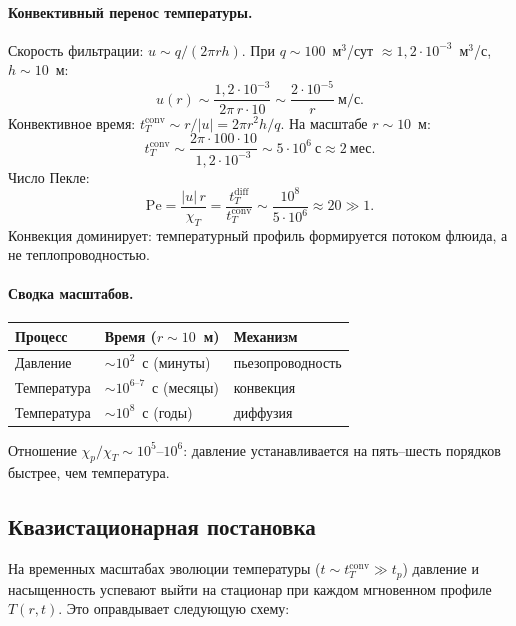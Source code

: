﻿\documentclass[12pt,a4paper]{article}
\begin{document}
\paragraph{Конвективный перенос температуры.}
Скорость фильтрации: $u \sim q/(2\pi r h)$.
При $q \sim 100$~м$^3$/сут $\approx 1{,}2\cdot 10^{-3}$~м$^3$/с,
$h \sim 10$~м:
\[
  u(r) \sim \frac{1{,}2\cdot 10^{-3}}{2\pi\,r\cdot 10}
  \sim \frac{2\cdot 10^{-5}}{r}~\text{м/с}.
\]
Конвективное время: $t_T^{\mathrm{conv}} \sim r/|u|
= 2\pi r^2 h / q$. На масштабе $r \sim 10$~м:
\begin{equation}\label{eq:tT_conv}
  t_T^{\mathrm{conv}} \sim \frac{2\pi\cdot 100\cdot 10}
  {1{,}2\cdot 10^{-3}} \sim 5\cdot 10^6~\text{с}
  \approx 2~\text{мес}.
\end{equation}
Число Пекле:
\begin{equation}\label{eq:Pe}
  \mathrm{Pe} = \frac{|u|\,r}{\chi_T}
  = \frac{t_T^{\mathrm{diff}}}{t_T^{\mathrm{conv}}}
  \sim \frac{10^8}{5\cdot 10^6} \approx 20 \gg 1.
\end{equation}
Конвекция доминирует: температурный профиль формируется
потоком флюида, а не теплопроводностью.

\paragraph{Сводка масштабов.}
\begin{center}
\begin{tabular}{lll}
\hline
Процесс & Время ($r \sim 10$~м) & Механизм \\
\hline
Давление      & $\sim 10^2$~с (минуты)   & пьезопроводность \\
Температура   & $\sim 10^{6\text{--}7}$~с (месяцы) & конвекция \\
Температура   & $\sim 10^8$~с (годы)    & диффузия \\
\hline
\end{tabular}
\end{center}
Отношение $\chi_p / \chi_T \sim 10^5$--$10^6$: давление
устанавливается на пять--шесть порядков быстрее, чем
температура.

\subsection{Квазистационарная постановка}\label{ssec:quasistat_formulation}

На временных масштабах эволюции температуры
($t \sim t_T^{\mathrm{conv}} \gg t_p$) давление
и насыщенность успевают выйти на стационар при каждом
мгновенном профиле $T(r,t)$. Это оправдывает
следующую схему:
\end{document}
